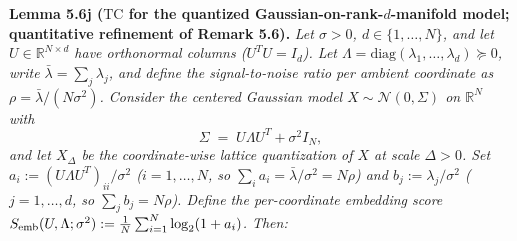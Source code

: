 \documentclass[
]{article}
\begin{document}
\textbf{Lemma 5.6j ($\mathrm{TC}$ for the quantized
Gaussian-on-rank-$d$-manifold model; quantitative refinement of
Remark 5.6).}
\emph{Let $\sigma > 0$, $d \in \{1, \dots, N\}$, and let $U \in
\mathbb{R}^{N \times d}$ have orthonormal columns ($U^T U = I_d$). Let
$\Lambda = \mathrm{diag}(\lambda_1, \dots, \lambda_d) \succeq 0$, write
$\bar\lambda = \sum_j \lambda_j$, and define the signal-to-noise ratio
per ambient coordinate as $\rho = \bar\lambda / (N \sigma^2)$. Consider
the centered Gaussian model $X \sim \mathcal{N}(0, \Sigma)$ on
$\mathbb{R}^N$ with}
\[
\Sigma \;=\; U \Lambda U^T + \sigma^2 I_N,
\tag{5.6j.1}
\]
\emph{and let $X_\Delta$ be the coordinate-wise lattice quantization of
$X$ at scale $\Delta > 0$. Set $a_i := (U \Lambda U^T)_{ii}/\sigma^2$
($i = 1, \dots, N$, so $\sum_i a_i = \bar\lambda/\sigma^2 = N \rho$) and
$b_j := \lambda_j / \sigma^2$ ($j = 1, \dots, d$, so $\sum_j b_j = N \rho$).
Define the per-coordinate embedding score
$S_{\rm emb}(U, \Lambda; \sigma^2) := \tfrac{1}{N} \sum_{i=1}^N
\log_2(1 + a_i)$. Then:}
\end{document}
